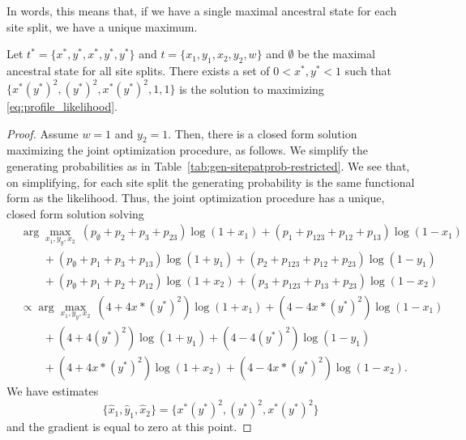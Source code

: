 In words, this means that, if we have a single maximal ancestral state for each site split, we have a unique maximum.

\begin{lemma}
Let $t^*=\{x^*, y^*, x^*, y^*, y^*\}$ and $t=\{x_1, y_1, x_2, y_2, w\}$ and $\emptyset$ be the maximal ancestral state for all site splits.
There exists a set of $0 < x^*, y^* < 1$ such that $\{x^*(y^*)^2, (y^*)^2, x^*(y^*)^2, 1, 1\}$ is the solution to maximizing \eqref{eq:profile_likelihood}.
\end{lemma}

\begin{proof}
Assume $w=1$ and $y_2=1$.
Then, there is a closed form solution maximizing the joint optimization procedure, as follows.
We simplify the generating probabilities as in Table~\ref{tab:gen-sitepatprob-restricted}.
We see that, on simplifying, for each site split the generating probability is the same functional form as the likelihood.
Thus, the joint optimization procedure has a unique, closed form solution solving
\begin{align*}
&\arg\max_{x_1,y_y,x_2} \ (p_{\emptyset} + p_2 + p_3 + p_{23}) \log(1+x_1) + (p_1 + p_{123} + p_{12} + p_{13}) \log(1-x_1)\\
               &\qquad + (p_{\emptyset} + p_1 + p_3 + p_{13}) \log(1+y_1) + (p_2 + p_{123} + p_{12} + p_{23}) \log(1-y_1)\\
               &\qquad + (p_{\emptyset} + p_1 + p_2 + p_{12}) \log(1+x_2) + (p_3 + p_{123} + p_{13} + p_{23}) \log(1-x_2)\\
&\propto\arg\max_{x_1,y_y,x_2} \ (4+4x*(y^*)^2) \log(1+x_1) + (4-4x*(y^*)^2) \log(1-x_1)\\
               &\qquad + (4+4(y^*)^2) \log(1+y_1) + (4-4(y^*)^2) \log(1-y_1)\\
               &\qquad + (4+4x*(y^*)^2) \log(1+x_2) + (4-4x*(y^*)^2) \log(1-x_2).
\end{align*}
We have estimates
\[
\{\hat{x}_1,\hat{y}_1,\hat{x}_2\} = \{x^*(y^*)^2, (y^*)^2, x^*(y^*)^2\}
\]
and the gradient is equal to zero at this point.


\end{proof}
